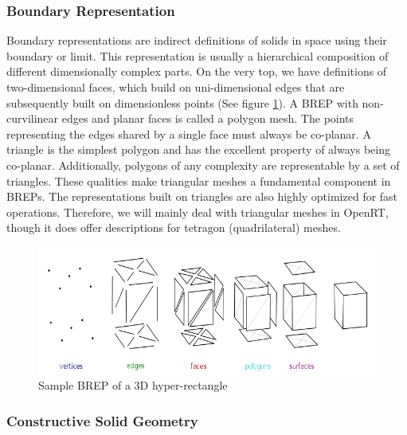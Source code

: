 \documentclass[a4paper,11pt,oneside]{article}
\begin{document}
\subsubsection{Boundary Representation}
    
Boundary representations are indirect definitions of solids in space using their boundary or limit. This representation is usually a hierarchical composition of different dimensionally complex parts. On the very top, we have definitions of two-dimensional faces, which build on uni-dimensional edges that are subsequently built on dimensionless points (See figure \ref{fig2:brep_3d_rect}). A BREP with non-curvilinear edges and planar faces is called a polygon mesh. The points representing the edges shared by a single face must always be co-planar. A triangle is the simplest polygon and has the excellent property of always being co-planar. Additionally, polygons of any complexity are representable by a set of triangles. These qualities make triangular meshes a fundamental component in BREPs. The representations built on triangles are also highly optimized for fast operations. Therefore, we will mainly deal with triangular meshes in OpenRT, though it does offer descriptions for tetragon (quadrilateral) meshes.
    
    
\begin{figure}[ht]
	\begin{center}
		\includegraphics[width=.6\textwidth]{intro-figures/brep-overview.png}
	\end{center}
	\caption{Sample BREP of a 3D hyper-rectangle \cite{wikipedia_2021_mesh_rep}}
	\label{fig2:brep_3d_rect}
\end{figure}
    
\subsubsection{Constructive Solid Geometry}
\end{document}
